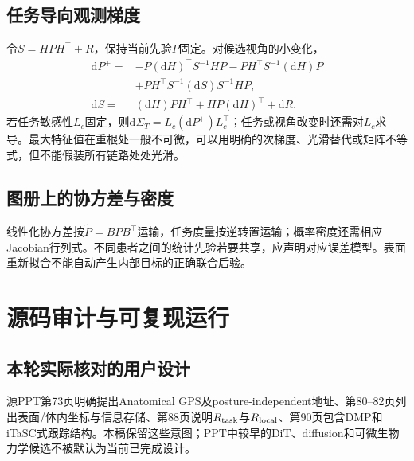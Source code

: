 \documentclass[UTF8,11pt,a4paper,fontset=fandol]{ctexart}
\numberwithin{equation}{section}
\theoremstyle{definition}
\newcommand{\dd}{\mathrm d}
\begin{document}
\subsection{任务导向观测梯度}
令$S=HPH^\top+R$，保持当前先验$P$固定。对候选视角的小变化，
\begin{align}
 \dd P^+={}&-P(\dd H)^\top S^{-1}HP-PH^\top S^{-1}(\dd H)P\\
 &+PH^\top S^{-1}(\dd S)S^{-1}HP,\\
 \dd S={}&(\dd H)PH^\top+HP(\dd H)^\top+\dd R.
\end{align}
若任务敏感性$L_c$固定，则$\dd\Sigma_T=L_c(\dd P^+)L_c^\top$；任务或视角改变时还需对$L_c$求导。最大特征值在重根处一般不可微，可以用明确的次梯度、光滑替代或矩阵不等式，但不能假装所有链路处处光滑。

\subsection{图册上的协方差与密度}
线性化协方差按$\widetilde P=B P B^\top$运输，任务度量按逆转置运输；概率密度还需相应Jacobian行列式。不同患者之间的统计先验若要共享，应声明对应误差模型。表面重新拟合不能自动产生内部目标的正确联合后验。

\section{源码审计与可复现运行}
\subsection{本轮实际核对的用户设计}
源PPT第73页明确提出Anatomical GPS及posture-independent地址、第80--82页列出表面/体内坐标与信息存储、第88页说明$R_{\rm task}$与$R_{\rm local}$、第90页包含DMP和iTaSC式跟踪结构。本稿保留这些意图；PPT中较早的DiT、diffusion和可微生物力学候选不被默认为当前已完成设计。
\end{document}
